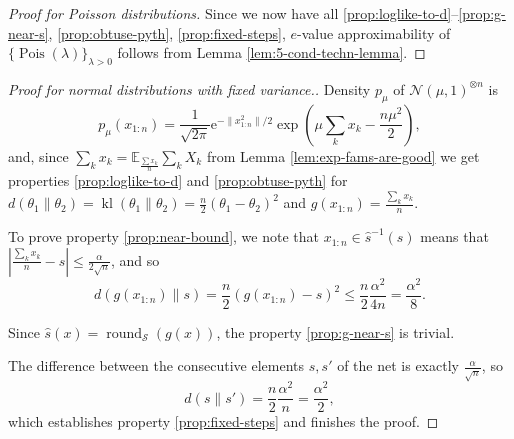 \documentclass{article}
\theoremstyle{definition}
\theoremstyle{definition}
\newcommand{\expectE}{\mathbb{E}}
\newcommand{\Pois}{\operatorname{Pois}}
\newcommand{\kl}{\operatorname{kl}}
\newcommand{\e}{\mathrm{e}}
\begin{document}
\begin{proof}[Proof for Poisson distributions]
	Since we now have all \ref{prop:loglike-to-d}--\ref{prop:g-near-s}, \ref{prop:obtuse-pyth}, \ref{prop:fixed-steps}, $e$-value approximability of $\{\Pois(\lambda)\}_{\lambda > 0}$ follows from Lemma \ref{lem:5-cond-techn-lemma}.
\end{proof}

\begin{proof}[Proof for normal distributions with fixed variance.]
    Density $p_\mu$ of $\mathcal{N}(\mu,1)^{\otimes n}$ is 
    \[
        p_\mu(x_{1:n}) = \frac{1}{\sqrt{2\pi}}\e^{-\|x_{1:n}^2\|/2} \exp\left( \mu \sum_k x_k - \frac{n\mu^2}{2}\right),
    \]
    and, since $\sum_k x_k = \expectE_{\frac{\sum x_k}{n}}\sum_k X_k$ from Lemma \ref{lem:exp-fams-are-good} we get properties \ref{prop:loglike-to-d} and \ref{prop:obtuse-pyth} for $d(\theta_1\|\theta_2)=\kl(\theta_1\|\theta_2)=\frac{n}{2}(\theta_1-\theta_2)^2$ and $g(x_{1:n}) = \frac{\sum_k x_k}{n}$.

    To prove property \ref{prop:near-bound}, we note that $x_{1:n} \in \hat{s}^{-1}(s)$ means that $\left|\frac{\sum_k x_k}{n} - s\right| \le \frac{\alpha}{2\sqrt{n}}$, and so
    \[
        d(g(x_{1:n})\|s) = \frac{n}{2}(g(x_{1:n})-s)^2 \le \frac{n}{2} \frac{\alpha^2}{4n} = \frac{\alpha^2}{8}.
    \]
    
    Since $\hat{s}(x)=\operatorname{round}_{\mathcal{S}}(g(x))$, the property \ref{prop:g-near-s} is trivial.

    The difference between the consecutive elements $s, s'$ of the net is exactly $\frac{\alpha}{\sqrt{n}}$, so
    \[
        d(s\|s') = \frac{n}{2} \frac{\alpha^2}{n} = \frac{\alpha^2}{2},
    \]
    which establishes property \ref{prop:fixed-steps} and finishes the proof.
\end{proof}
\end{document}
